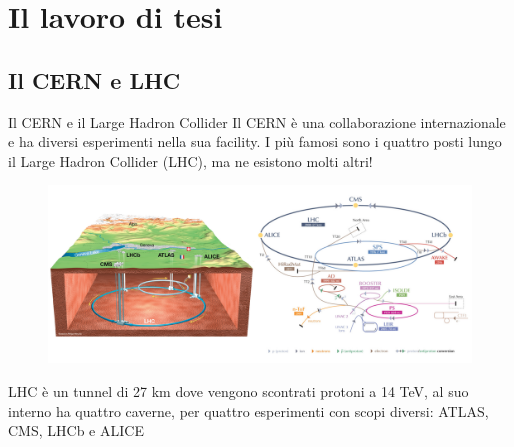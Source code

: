 \documentclass[
10pt,
aspectratio=169,
]{beamer}
\begin{document}
\section{Il lavoro di tesi}
\subsection{Il CERN e LHC}
\begin{frame}{Il CERN e il Large Hadron Collider}
Il CERN è una collaborazione internazionale e ha diversi esperimenti nella sua facility. I più famosi sono i quattro posti lungo il Large Hadron Collider (LHC), ma ne esistono molti altri!
\begin{figure}
    \centering
    \includegraphics[width=0.8\linewidth]{lhc.png}
\end{figure}
    LHC è un tunnel di 27 km dove vengono scontrati protoni a 14 TeV, al suo interno ha quattro caverne, per quattro esperimenti con scopi diversi: ATLAS, CMS, LHCb e ALICE
\end{frame}
\end{document}
